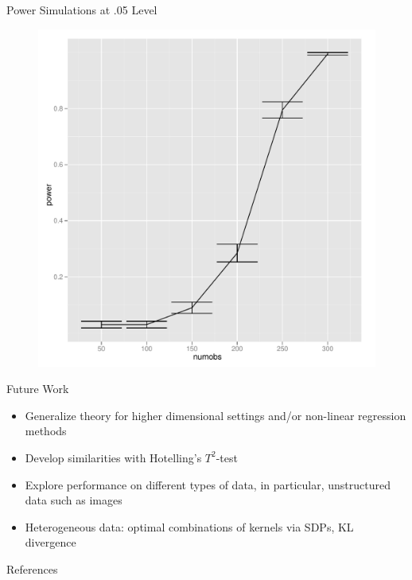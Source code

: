 \documentclass{beamer}
\begin{document}
\begin{frame}{Power Simulations at .05 Level}
   \begin{figure}[!ht]
   \centering
   \includegraphics[scale=.4]{pres7.pdf}  
 \end{figure}
\end{frame}

\begin{frame}{Future Work}
  \begin{itemize}
  \item Generalize theory for higher dimensional settings and/or
    non-linear regression methods \pause
  \item Develop similarities with Hotelling's $T^2$-test \pause
  \item Explore performance on different types of data, in particular,
    unstructured data such as images \pause
  \item Heterogeneous data: optimal combinations of kernels
    via SDPs, KL divergence \pause
  \end{itemize}
\end{frame}

\begin{frame}[allowframebreaks]{References}
  
  
\end{frame}
\end{document}
